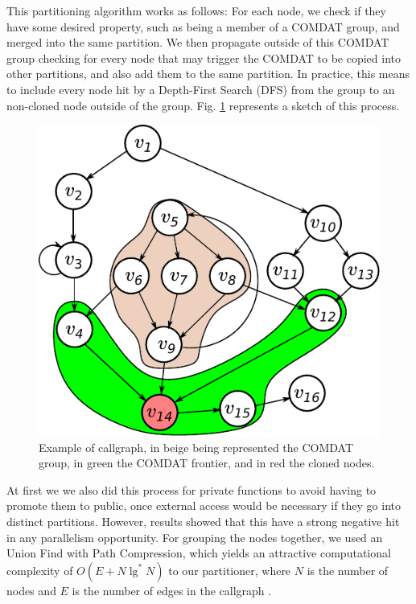 \documentclass[runningheads]{llncs}
\begin{document}
This partitioning algorithm works as follows: For each node, we check if they
have some desired property, such as being a member of a COMDAT group, and
merged into the same partition. We then propagate outside of this COMDAT group
checking for every node that may trigger the COMDAT to be copied into other
partitions, and also add them to the same partition. In practice,
this means to include every node hit by a Depth-First
Search (DFS) from the group to an non-cloned node outside of the group.
Fig. \ref{fig:comdat_frontier} represents a sketch of this process.

\begin{figure}
\centering
	 \includegraphics[scale=0.8]{figuras/comdat_frontier.pdf}
	  \caption{Example of callgraph, in beige being represented the COMDAT group,
	  in green the COMDAT frontier, and in red the cloned nodes.}
	  \label{fig:comdat_frontier}
\end{figure}

At first we we also did this process for private functions to avoid having to
promote them to public, once external access would be necessary if they go
into distinct partitions. However, results showed that this have a strong
negative hit in any parallelism opportunity. For grouping the nodes together,
we used an Union Find with Path Compression, which yields an attractive
computational complexity of $O(E + N \lg^*N)$ to our partitioner, where $N$ is the
number of nodes and $E$ is the number of edges in the callgraph \cite{feufiloff}.
\end{document}
